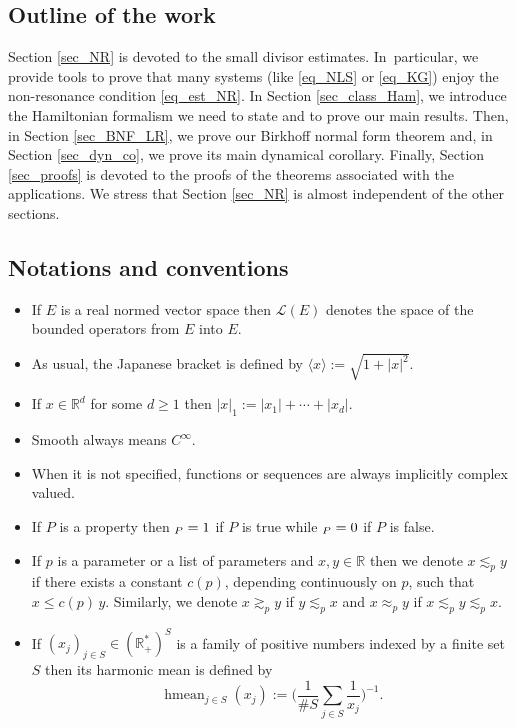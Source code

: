 \documentclass[11pt]{article}
\makeatletter
\newcommand{\Subsection}{\subsection}
\DeclareRobustCommand{\mathbbm}[1]{\csname jepbb@#1\endcsname}
\theoremstyle{definition}
\makeatother
\begin{document}
\subsection{Outline of the work} Section \ref{sec_NR} is devoted to the small divisor estimates. In~particular, we provide tools to prove that many systems (like \eqref{eq_NLS} or \eqref{eq_KG}) enjoy the non-resonance condition \eqref{eq_est_NR}. In Section \ref{sec_class_Ham}, we introduce the Hamiltonian formalism we need to state and to prove our main results. Then, in Section \ref{sec_BNF_LR}, we prove our Birkhoff normal form theorem and, in Section \ref{sec_dyn_co}, we prove its main dynamical corollary. Finally, Section \ref{sec_proofs} is devoted to the proofs of the theorems associated with the applications. We stress that Section \ref{sec_NR} is almost independent of the other sections.

\Subsection{Notations and conventions}

\begin{itemize}
\item
If $E$ is a real normed vector space then $\mathscr{L}(E)$ denotes the space of the bounded operators from $E$ into $E$.

\item
As usual, the Japanese bracket is defined by $\langle x\rangle:= \sqrt{1+|x|^2}$.

\item
If $x\in \mathbb{R}^d$ for some $d\geq 1$ then $|x|_1:=|x_1|+\cdots+|x_d|$.

\item
Smooth always means $C^\infty$.

\item
When it is not specified, functions or sequences are always implicitly complex valued.

\item
If $P$ is a property then $\mathbbm{1}_P = 1$ if $P$ is true while $\mathbbm{1}_P = 0$ if $P$ is false.

\item
If $p$ is a parameter or a list of parameters and $x,y\in \mathbb{R}$ then we denote $x\lesssim_p y$ if there exists a constant $c(p)$, depending continuously on $p$, such that $x\leq c(p) \, y$. Similarly, we denote $x\gtrsim_p y$ if $y\lesssim_p x$ and $x\approx_p y$ if $x\lesssim_p y\lesssim_p x$.

\item
If $(x_j)_{j\in S} \in (\mathbb{R}_{+}^*)^S$ is a family of positive numbers indexed by a finite set $S$ then its harmonic mean is defined by
\begin{equation}
\label{eq_def_hmean}
\mathop{\mathrm{hmean}}_{j\in S} (x_j):=\biggl(\frac1{\# S} \sum_{j\in S} \frac1{x_j} \biggr)^{-1}.
\end{equation}
\end{itemize}
\end{document}
